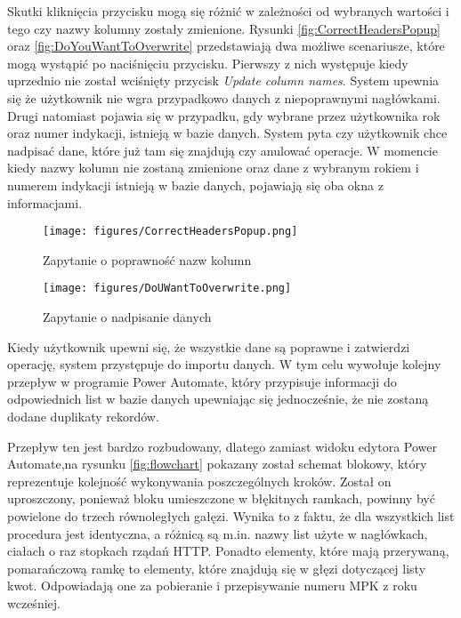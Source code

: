 Skutki kliknięcia przycisku mogą się różnić w zależności od wybranych wartości i tego czy nazwy kolumny zostały zmienione. Rysunki \ref{fig:CorrectHeadersPopup} oraz \ref{fig:DoYouWantToOverwrite} przedstawiają dwa możliwe scenariusze, które mogą wystąpić po naciśnięciu przycisku. Pierwszy z nich występuje kiedy uprzednio nie został wciśnięty przycisk \emph{Update column names}. System upewnia się że użytkownik nie wgra przypadkowo danych z niepoprawnymi nagłówkami. Drugi natomiast pojawia się w przypadku, gdy wybrane przez użytkownika rok oraz numer indykacji, istnieją w bazie danych. System pyta czy użytkownik chce nadpisać dane, które już tam się znajdują czy anulować operacje. W momencie kiedy nazwy kolumn nie zostaną zmienione oraz dane z wybranym rokiem i numerem indykacji istnieją w bazie danych, pojawiają się oba okna z informacjami.

\begin{figure}[htbp]
    \centering
    \begin{minipage}{0.48\textwidth}
        \centering
        \texttt{[image: figures/CorrectHeadersPopup.png]}
        \caption{Zapytanie o poprawność nazw kolumn}
        \label{fig:CorrectHeadersPopup}
    \end{minipage}\hfill
    \begin{minipage}{0.48\textwidth}
        \centering
        \texttt{[image: figures/DoUWantToOverwrite.png]}
        \caption{Zapytanie o nadpisanie danych}
        \label{fig:DoYouWantToOverwrite}
    \end{minipage}
    \label{fig:obrazki}
\end{figure}

Kiedy użytkownik upewni się, że wszystkie dane są poprawne i zatwierdzi operację, system przystępuje do importu danych. W tym celu wywołuje kolejny przepływ w programie Power Automate, który przypisuje informacji do odpowiednich list w bazie danych upewniając się jednocześnie, że nie zostaną dodane duplikaty rekordów. 

\noindent Przepływ ten jest bardzo rozbudowany, dlatego zamiast widoku edytora Power Automate,na rysunku \ref{fig:flowchart} pokazany został schemat blokowy, który reprezentuje kolejność wykonywania poszczególnych kroków. Został on uproszczony, ponieważ bloku umieszczone w błękitnych ramkach, powinny być powielone do trzech równoległych gałęzi. Wynika to z faktu, że dla wszystkich list procedura jest identyczna, a różnicą są m.in. nazwy list użyte w nagłówkach, ciałach o raz stopkach rządań HTTP. Ponadto elementy, które mają przerywaną, pomarańczową ramkę to elementy, które znajdują się w głęzi dotyczącej listy kwot. Odpowiadają one za pobieranie i przepisywanie numeru MPK z roku wcześniej.


